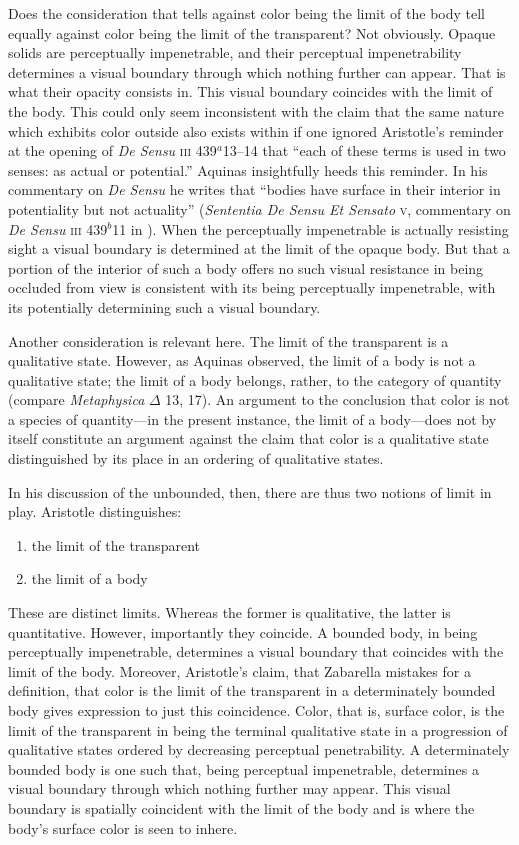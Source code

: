\label{actual_potential} Does the consideration that tells against color being the limit of the body tell equally against color being the limit of the transparent? Not obviously. Opaque solids are perceptually impenetrable, and their perceptual impenetrability determines a visual boundary through which nothing further can appear. That is what their opacity consists in. This visual boundary coincides with the limit of the body. This could only seem inconsistent with the claim that the same nature which exhibits color outside also exists within if one ignored Aristotle's reminder at the opening of \emph{De Sensu} \textsc{iii} 439\( ^{a} \)13--14 that ``each of these terms is used in two senses: as actual or potential.'' Aquinas insightfully heeds this reminder. In his commentary on \emph{De Sensu} he writes that ``bodies have surface in their interior in potentiality but not actuality'' (\emph{Sententia De Sensu Et Sensato} \textsc{v}, commentary on \emph{De Sensu} \textsc{iii} 439\( ^{b} \)11 in \citealt{White:2005vn}). When the perceptually impenetrable is actually resisting sight a visual boundary is determined at the limit of the opaque body. But that a portion of the interior of such a body offers no such visual resistance in being occluded from view is consistent with its being perceptually impenetrable, with its potentially determining such a visual boundary.

Another consideration is relevant here. The limit of the transparent is a qualitative state. However, as Aquinas observed, the limit of a body is not a qualitative state; the limit of a body belongs, rather, to the category of quantity (compare \emph{Metaphysica} \( \Delta \) 13, 17). An argument to the conclusion that color is not a species of quantity---in the present instance, the limit of a body---does not by itself constitute an argument against the claim that color is a qualitative state distinguished by its place in an ordering of qualitative states.

In his discussion of the unbounded, then, there are thus two notions of limit in play. Aristotle distinguishes:
\begin{enumerate}[(1)]
	\item the limit of the transparent
	\item the limit of a body
\end{enumerate}
These are distinct limits. Whereas the former is qualitative, the latter is quantitative. However, importantly they coincide. A bounded body, in being perceptually impenetrable, determines a visual boundary that coincides with the limit of the body. Moreover, Aristotle's claim, that Zabarella mistakes for a definition, that color is the limit of the transparent in a determinately bounded body gives expression to just this coincidence. Color, that is, surface color, is the limit of the transparent in being the terminal qualitative state in a progression of qualitative states ordered by decreasing perceptual penetrability. A determinately bounded body is one such that, being perceptual impenetrable, determines a visual boundary through which nothing further may appear. This visual boundary is spatially coincident with the limit of the body and is where the body's surface color is seen to inhere.


